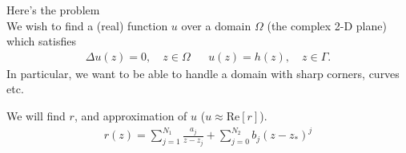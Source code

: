 \documentclass{seminar}
\begin{document}
\begin{slide} %
\large Here's the problem\\

\small
We wish to find a (real) function $u$ over a domain $\Omega$ (the complex 2-D plane) which satisfies
\begin{align*}
\Delta u(z)=0, \quad z\in \Omega &&
u(z)=h(z), \quad z\in \Gamma .
\end{align*}
In particular, we want to be able to handle a domain with sharp corners, curves etc. 

We will find $r$, and approximation of $u$ ($u\approx\mathrm{Re}[r]$).
\begin{align*}
r(z)= \sum_{j=1}^{N_1} \frac{a_j}{z-z_j} + \sum_{j=0}^{N_2} b_j (z-z_*)^j
\end{align*}
\end{slide} %
\end{document}
